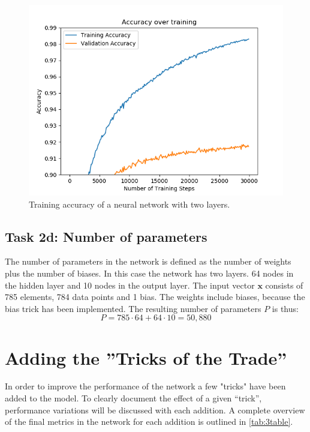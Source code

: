 \documentclass{article}
\begin{document}
\begin{figure}[H]
    \centering
    \includegraphics[width=\textwidth]{Assignments/Assignment_2/plots/task2abc/2c_accuracy.png}
    \caption{Training accuracy of a neural network with two layers.}
    \label{fig:task2acc}
\end{figure}

\subsection{Task 2d: Number of parameters}
The number of parameters in the network is defined as the number of weights plus the number of biases. In this case the network has two layers. 64 nodes in the hidden layer and 10 nodes in the output layer. The input vector $\boldsymbol{x}$ consists of 785 elements, 784 data points and 1 bias. The weights include biases, because the bias trick has been implemented. The resulting number of parameters $P$ is thus:
\begin{equation}
    P = 785\cdot64 + 64\cdot 10 = 50,880 
    \label{eq:num_params}
\end{equation}


\section{Adding the ”Tricks of the Trade”}

In order to improve the performance of the network a few "tricks" have been added to the model. To clearly document the effect of a given ``trick'', performance variations will be discussed with each addition. A complete overview of the final metrics in the network for each addition is outlined in \autoref{tab:3table}.
\end{document}
